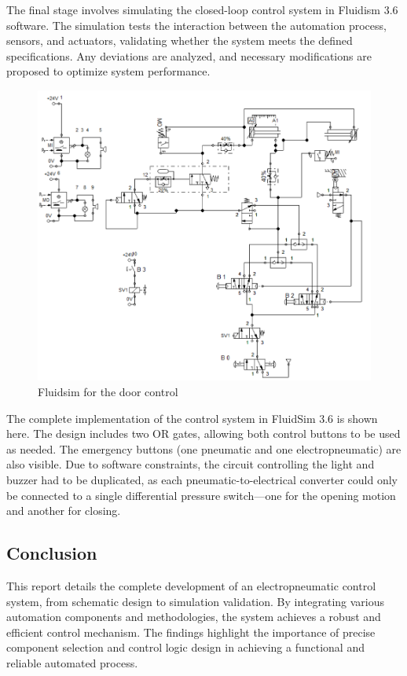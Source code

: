 The final stage involves simulating the closed-loop control system in Fluidism 3.6 software. 
The simulation tests the interaction between the automation process, sensors, and actuators, 
validating whether the system meets the defined specifications. Any deviations are analyzed, 
and necessary modifications are proposed to optimize system performance.

\begin{figure}[H]
    \includegraphics[width=16cm]{Images/Q1/fluidsim.png}
    \centering
    \caption{Fluidsim for the door control}
    \label{fig:fluidsim}
\end{figure}

The complete implementation of the control system in FluidSim 3.6 is shown here. The design includes two OR gates, 
allowing both control buttons to be used as needed. The emergency buttons (one pneumatic and one electropneumatic) 
are also visible. Due to software constraints, the circuit controlling the light and buzzer had to be duplicated, as 
each pneumatic-to-electrical converter could only be connected to a single differential pressure switch—one for the 
opening motion and another for closing.\\

\subsection{Conclusion}

This report details the complete development of an electropneumatic control system, from schematic 
design to simulation validation. By integrating various automation components and methodologies, 
the system achieves a robust and efficient control mechanism. The findings highlight the importance 
of precise component selection and control logic design in achieving a functional and reliable 
automated process.